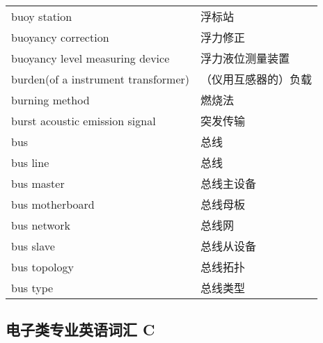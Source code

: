 \documentclass[
]{article}
\begin{document}
\begin{longtable}[]{@{}ll@{}}
buoy station & 浮标站 \\
buoyancy correction & 浮力修正 \\
buoyancy level measuring device & 浮力液位测量装置 \\
burden(of a instrument transformer) & （仪用互感器的）负载 \\
burning method & 燃烧法 \\
burst acoustic emission signal & 突发传输 \\
bus & 总线 \\
bus line & 总线 \\
bus master & 总线主设备 \\
bus motherboard & 总线母板 \\
bus network & 总线网 \\
bus slave & 总线从设备 \\
bus topology & 总线拓扑 \\
bus type & 总线类型 \\
\bottomrule()
\end{longtable}

\hypertarget{ux7535ux5b50ux7c7bux4e13ux4e1aux82f1ux8bedux8bcdux6c47-c}{%
\subsection{\texorpdfstring{电子类专业英语词汇 C
}{电子类专业英语词汇 C }}\label{ux7535ux5b50ux7c7bux4e13ux4e1aux82f1ux8bedux8bcdux6c47-c}}
\end{document}
